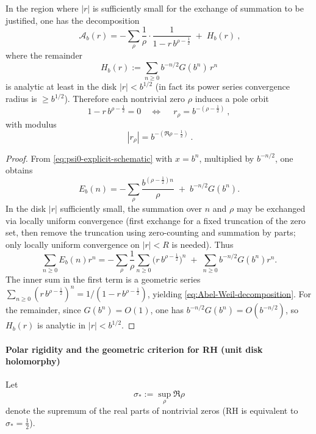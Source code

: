 \begin{theorem}\label{thm:discrete-abel-weil-expansion}
In the region where \(|r|\) is sufficiently small for the exchange of summation to be justified, one has the decomposition
\begin{equation}\label{eq:Abel-Weil-decomposition}
\boxed{\ \mathcal A_b(r)
=-\sum_{\rho}\frac{1}{\rho}\cdot\frac{1}{1-r\,b^{\rho-\frac12}}
\;+\;H_b(r)\ },
\end{equation}
where the remainder
\[
H_b(r):=\sum_{n\ge 0}b^{-n/2}G(b^n)\,r^n
\]
is analytic at least in the disk \(|r|<b^{1/2}\) (in fact its power series convergence radius is \(\ge b^{1/2}\)).
Therefore each nontrivial zero \(\rho\) induces a pole orbit
\[
1-r\,b^{\rho-\frac12}=0
\quad\Longleftrightarrow\quad
\boxed{\ r_\rho=b^{-(\rho-\frac12)}\ },
\]
with modulus
\[
\boxed{\ |r_\rho|=b^{-(\Re\rho-\frac12)}\ }.
\]
\end{theorem}
\begin{proof}
From \eqref{eq:psi0-explicit-schematic} with \(x=b^n\), multiplied by \(b^{-n/2}\), one obtains
\[
E_b(n)
=-\sum_\rho \frac{b^{(\rho-\frac12)n}}{\rho}
\;+\;b^{-n/2}G(b^n).
\]
In the disk \(|r|\) sufficiently small, the summation over \(n\) and \(\rho\) may be exchanged via locally uniform convergence (first exchange for a fixed truncation of the zero set, then remove the truncation using zero-counting and summation by parts; only locally uniform convergence on \(|r|<R\) is needed). Thus
\[
\sum_{n\ge 0}E_b(n)r^n
=-\sum_\rho \frac{1}{\rho}\sum_{n\ge 0}\bigl(r\,b^{\rho-\frac12}\bigr)^n
\;+\;\sum_{n\ge 0}b^{-n/2}G(b^n)r^n.
\]
The inner sum in the first term is a geometric series \(\sum_{n\ge 0}(r\,b^{\rho-\frac12})^n=1/(1-r\,b^{\rho-\frac12})\), yielding \eqref{eq:Abel-Weil-decomposition}.
For the remainder, since \(G(b^n)=O(1)\), one has \(b^{-n/2}G(b^n)=O(b^{-n/2})\), so \(H_b(r)\) is analytic in \(|r|<b^{1/2}\).
\end{proof}

\paragraph{Polar rigidity and the geometric criterion for RH (unit disk holomorphy)}
Let
\[
\sigma_*:=\sup_{\rho}\Re\rho
\]
denote the supremum of the real parts of nontrivial zeros (RH is equivalent to \(\sigma_*=\tfrac12\)).

